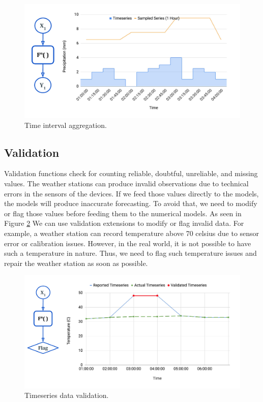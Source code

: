 \begin{figure}[htp]
    \centering
    \includegraphics[width=1.0\textwidth]{method/data_preprocess/transformation.pdf}
    \caption{Time interval aggregation.}
    \label{fi:transformation}
\end{figure}

\subsection{Validation}
Validation functions check for counting reliable, doubtful, unreliable, and missing values. The weather stations can produce invalid observations due to technical errors in the sensors of the devices. If we feed those values directly to the models, the models will produce inaccurate forecasting. To avoid that, we need to modify or flag those values before feeding them to the numerical models. As seen in Figure \ref{fi:validation} We can use validation extensions to modify or flag invalid data. For example, a weather station can record temperature above 70 celsius due to sensor error or calibration issues. However, in the real world, it is not possible to have such a temperature in nature. Thus, we need to flag such temperature issues and repair the weather station as soon as possible.

\begin{figure}[htp]
    \centering
    \includegraphics[width=1.0\textwidth]{method/data_preprocess/validation.pdf}
    \caption{Timeseries data validation.}
    \label{fi:validation}
\end{figure}

